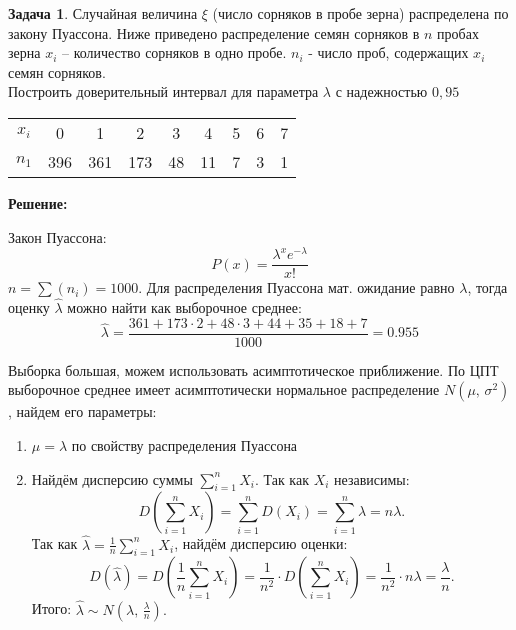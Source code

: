 \documentclass[a4paper,11pt]{article}
\newenvironment{shdd}{\begin{mdframed}[backgroundcolor=shadecolor]}{\end{mdframed}}
\theoremstyle{definition}
\newtheorem{problem}{Задача}\setlength{\parindent}{0pt}
\newenvironment{solution}
{\begin{shdd}\textbf{Решение:}\par\setlength{\parindent}{0pt}}
{\end{shdd}}
\begin{document}
\vspace{10pt}
\begin{problem}
    Случайная величина \(\xi\) (число сорняков в пробе зерна) распределена по закону
    Пуассона. Ниже приведено распределение семян сорняков в \(n\) пробах зерна \(x_i\) –
    количество сорняков в одно пробе. \(n_i\) - число проб, содержащих \(x_i\) семян сорняков.
    \\Построить доверительный интервал для параметра \(\lambda\) с надежностью \(0,95\)
    \begin{table}[H]
        \centering
        \begin{adjustbox}{max width=\textwidth}
            \begin{tabular}{c c c c c c c c c}
                \toprule
                \midrule
                    \(x_i\) & 0   & 1   & 2   & 3  & 4 & 5 & 6 & 7 \\
                    \(n_1\) & 396 & 361 & 173 & 48 & 11 & 7 & 3 & 1 \\
            \bottomrule
            \end{tabular}
        \end{adjustbox}
    \end{table}  

    
    \begin{solution}
        Закон Пуассона: 
        \[
        P(x) = \frac{\lambda^x e^{-\lambda}}{x!} 
        \]
        \(n = \sum(n_i) = 1000\). Для распределения Пуассона мат. ожидание равно \(\lambda\), 
        тогда оценку \(\hat{\lambda}\) можно найти как выборочное среднее: 
        \[
        \hat{\lambda} = \frac{361 + 173\cdot2 + 48\cdot3 + 44 + 35 + 18 + 7}{1000} = 0.955
        \] 

        Выборка большая, можем использовать асимптотическое приближение. По ЦПТ выборочное среднее 
        имеет асимптотически нормальное распределение \(N(\mu,\, \sigma^2)\), найдем его параметры:
        \begin{enumerate}
            \item \(\mu = \lambda\) по свойству распределения Пуассона
            \item Найдём дисперсию суммы \( \sum_{i=1}^n X_i \). Так как \(X_i\) независимы:
            \[
            D\left(\sum_{i=1}^n X_i\right) = \sum_{i=1}^n D(X_i) = \sum_{i=1}^n \lambda = n\lambda.
            \]
            Так как \(\hat{\lambda} = \frac{1}{n} \sum_{i=1}^n X_i\), найдём дисперсию оценки:
            \[
            D(\hat{\lambda}) = D\left(\frac{1}{n} \sum_{i=1}^n X_i \right) 
            = \frac{1}{n^2} \cdot D\left(\sum_{i=1}^n X_i\right) 
            = \frac{1}{n^2} \cdot n\lambda = \frac{\lambda}{n}.
            \]
            Итого: \(\hat{\lambda} \sim N\left(\lambda,\, \frac{\lambda}{n}\right).\)
        \end{enumerate}
            

\end{solution}
\end{problem}
\end{document}
